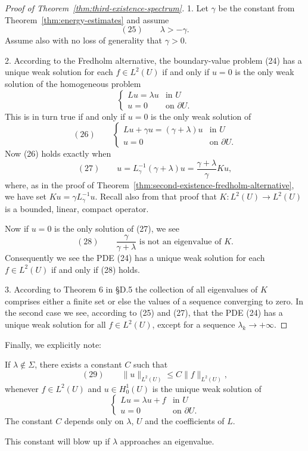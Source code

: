 \begin{proof}[Proof of Theorem~\ref{thm:third-existence-spectrum}]
1. Let $\gamma$ be the constant from Theorem~\ref{thm:energy-estimates} and assume
$$(25) \qquad \lambda > -\gamma.$$
Assume also with no loss of generality that $\gamma > 0$.

2. According to the Fredholm alternative, the boundary-value problem (24) has a unique weak solution for each $f \in L^2(U)$ if and only if $u = 0$ is the only weak solution of the homogeneous problem
$$\begin{cases} Lu = \lambda u & \text{in } U \\ u = 0 & \text{on } \partial U. \end{cases}$$
This is in turn true if and only if $u = 0$ is the only weak solution of
$$(26) \qquad \begin{cases} Lu + \gamma u = (\gamma+\lambda)u & \text{in } U \\ u = 0 & \text{on } \partial U. \end{cases}$$
Now (26) holds exactly when
$$(27) \qquad u = L_\gamma^{-1}(\gamma+\lambda)u = \frac{\gamma+\lambda}\gamma Ku,$$
where, as in the proof of Theorem~\ref{thm:second-existence-fredholm-alternative}, we have set $Ku = \gamma L_\gamma^{-1}u$. Recall also from that proof that $K : L^2(U) \to L^2(U)$ is a bounded, linear, compact operator.

Now if $u = 0$ is the only solution of (27), we see
$$(28) \qquad \frac\gamma{\gamma+\lambda} \text{ is not an eigenvalue of } K.$$
Consequently we see the PDE (24) has a unique weak solution for each $f \in L^2(U)$ if and only if (28) holds.

3. According to Theorem 6 in \S D.5 the collection of all eigenvalues of $K$ comprises either a finite set or else the values of a sequence converging to zero. In the second case we see, according to (25) and (27), that the PDE (24) has a unique weak solution for all $f \in L^2(U)$, except for a sequence $\lambda_k \to +\infty$.
\end{proof}

Finally, we explicitly note:

\begin{theorem}
\label{thm:boundedness-of-inverse}
If $\lambda \notin \Sigma$, there exists a constant $C$ such that
$$(29) \qquad \|u\|_{L^2(U)} \leq C\|f\|_{L^2(U)},$$
whenever $f \in L^2(U)$ and $u \in H_0^1(U)$ is the unique weak solution of
$$\begin{cases} Lu = \lambda u + f & \text{in } U \\ u = 0 & \text{on } \partial U. \end{cases}$$
The constant $C$ depends only on $\lambda$, $U$ and the coefficients of $L$.

This constant will blow up if $\lambda$ approaches an eigenvalue.
\end{theorem}

